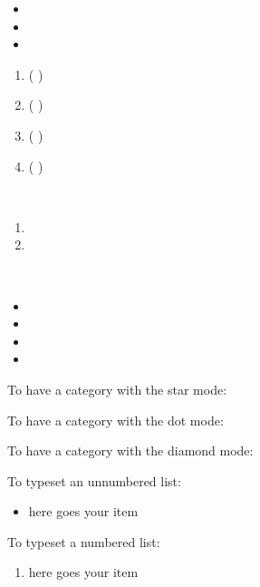 
\begin{itemize}
\item \feat{}{}
\item \feat{}{}
\item \feat{}{}
\end{itemize}
\begin{enumerate}
\item \family{}    {}
          \entry {}  { \atsign{}{}( \prop{} )  }
\item \family{}    {}
          \entry {}  { \atsign{}{}( \prop{} )  }
\item \family{}    {}
          \entry {}  { \atsign{}{}( \prop{} )  }
\item \family{}    {}
          \entry {}  { \atsign{}{}( \prop{} )  }
\end{enumerate}
 \\
\begin{enumerate}
\item 
               \tc{}
               {}
               {\atsign{}{}}
\item 
               \tc{}
               {}
               {\atsign{}{}}
\end{enumerate}

 \\
\begin{itemize}
\item \dict{}{}{}
\item \dict{}{}{}
\item \dict{}{}{}
\item \dict{}{}{}
\end{itemize}




To have a category with the star mode: 

To have a category with the dot mode:  

To have a category with the diamond mode:  

To typeset an unnumbered list: 

\begin{itemize}
\item here goes your item
\end{itemize}

To typeset a numbered list: 

\begin{enumerate}
\item here goes your item
\end{enumerate}